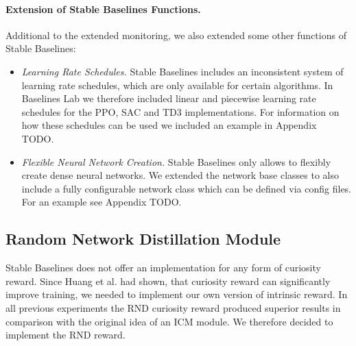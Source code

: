 \paragraph{Extension of Stable Baselines Functions.}
Additional to the extended monitoring, we also extended some other functions of Stable Baselines:

\begin{itemize}
    \item \textit{Learning Rate Schedules.} Stable Baselines includes an inconsistent system of learning rate schedules, which are only available for certain algorithms. In Baselines Lab we therefore included linear and piecewise learning rate schedules for the PPO, SAC and TD3 implementations. For information on how these schedules can be used we included an example in Appendix TODO.
    \item \textit{Flexible Neural Network Creation.} Stable Baselines only allows to flexibly create dense neural networks. We extended the network base classes to also include a fully configurable network class which can be defined via config files. For an example see Appendix TODO.
\end{itemize}


\subsection{Random Network Distillation Module} \label{sec:blRND}
Stable Baselines does not offer an implementation for any form of curiosity reward. Since Huang et al. had shown, that curiosity reward can significantly improve training, we needed to implement our own version of intrinsic reward. In all previous experiments the RND curiosity reward produced superior results in comparison with the original idea of an ICM module. We therefore decided to implement the RND reward. 

